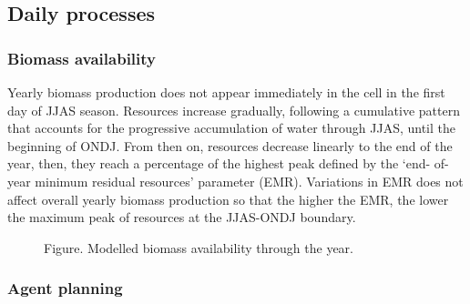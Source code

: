 \documentclass[11pt,oneside,a4paper,openright]{report}
\begin{document}
\subsection{Daily processes}

\subsubsection{Biomass availability}
Yearly biomass production does not appear immediately in the cell in the first day of JJAS season.
Resources increase gradually, following a cumulative pattern that accounts for the progressive
accumulation of water through JJAS, until the beginning of ONDJ. From then on, resources decrease
linearly to the end of the year, then, they reach a percentage of the highest peak defined by the ‘end-
of-year minimum residual resources’ parameter (EMR). Variations in EMR does not affect overall
yearly biomass production so that the higher the EMR, the lower the maximum peak of resources at
the JJAS-ONDJ boundary.


\begin{figure}[h]
\centering
\setlength\fboxsep{0pt}
\setlength\fboxrule{0.5pt}
\caption{Figure. Modelled biomass availability through the year.}
\label{fig:resourceGrowing}
\end{figure}


\subsubsection{Agent planning}
\label{subsubsec:AgentPlanning}
\end{document}
